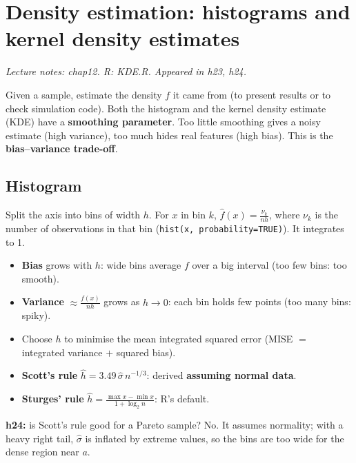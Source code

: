 \section{Density estimation: histograms and kernel density estimates}
\textit{Lecture notes: chap12. R: KDE.R. Appeared in h23, h24.}

\begin{idea}
Given a sample, estimate the density $f$ it came from (to present results or to check simulation code). Both the histogram and the kernel density estimate (KDE) have a \textbf{smoothing parameter}. Too little smoothing gives a noisy estimate (high variance), too much hides real features (high bias). This is the \textbf{bias--variance trade-off}.
\end{idea}

\subsection{Histogram}
Split the axis into bins of width $h$. For $x$ in bin $k$, $\hat f(x) = \frac{\nu_k}{nh}$, where $\nu_k$ is the number of observations in that bin (\texttt{hist(x, probability=TRUE)}). It integrates to 1.
\begin{itemize}
  \item \textbf{Bias} grows with $h$: wide bins average $f$ over a big interval (too few bins: too smooth).
  \item \textbf{Variance} $\approx\frac{f(x)}{nh}$ grows as $h\to0$: each bin holds few points (too many bins: spiky).
  \item Choose $h$ to minimise the mean integrated squared error (MISE $=$ integrated variance $+$ squared bias).
  \item \textbf{Scott's rule} $\hat h = 3.49\,\hat\sigma\,n^{-1/3}$: derived \textbf{assuming normal data}.
  \item \textbf{Sturges' rule} $\hat h = \frac{\max x-\min x}{1+\log_2n}$: R's default.
\end{itemize}
\textbf{h24:} is Scott's rule good for a Pareto sample? No. It assumes normality; with a heavy right tail, $\hat\sigma$ is inflated by extreme values, so the bins are too wide for the dense region near $a$.

